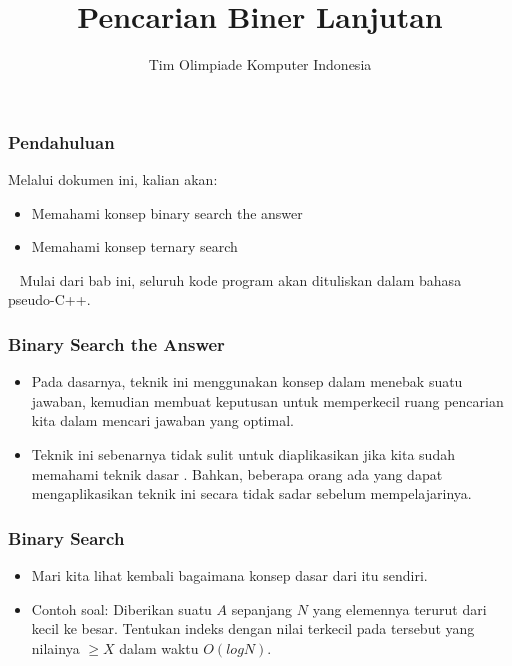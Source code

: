 

\title{Pencarian Biner Lanjutan}
\author{Tim Olimpiade Komputer Indonesia}
\date{}



\begin{frame}
\titlepage
\end{frame}

\begin{frame}
\frametitle{Pendahuluan}
Melalui dokumen ini, kalian akan:
\begin{itemize}
  \item Memahami konsep binary search the answer
  \item Memahami konsep ternary search
\end{itemize}
~\newline
Mulai dari bab ini, seluruh kode program akan dituliskan dalam bahasa pseudo-C++.
\end{frame}

\begin{frame}
\frametitle{Binary Search the Answer}
\begin{itemize}
  \item Pada dasarnya, teknik ini menggunakan konsep \fbinarySearch dalam menebak suatu jawaban, kemudian membuat keputusan untuk memperkecil ruang pencarian kita dalam mencari jawaban yang optimal.
  \item Teknik ini sebenarnya tidak sulit untuk diaplikasikan jika kita sudah memahami teknik dasar \fbinarySearch. Bahkan, beberapa orang ada yang dapat mengaplikasikan teknik ini secara tidak sadar sebelum mempelajarinya.
\end{itemize}
\end{frame}

\begin{frame}
\frametitle{Binary Search}
\begin{itemize}
  \item Mari kita lihat kembali bagaimana konsep dasar dari \fbinarySearch itu sendiri.
  \item Contoh soal: Diberikan suatu \farray $A$ sepanjang $N$ yang elemennya terurut dari kecil ke besar. Tentukan indeks dengan nilai terkecil pada \farray tersebut yang nilainya $ \ge X$ dalam waktu $O(log N)$.
\end{itemize}
\end{frame}

